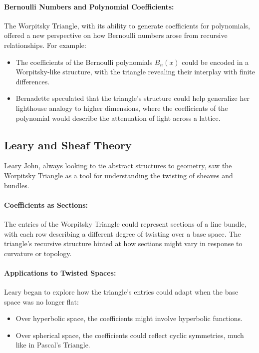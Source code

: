 \paragraph{Bernoulli Numbers and Polynomial Coefficients:} The Worpitsky Triangle, with its ability to generate coefficients for polynomials, offered a new perspective on how Bernoulli numbers arose from recursive relationships. For example:
\begin{itemize}
    \item The coefficients of the Bernoulli polynomials \(B_n(x)\) could be encoded in a Worpitsky-like structure, with the triangle revealing their interplay with finite differences.
    \item Bernadette speculated that the triangle’s structure could help generalize her lighthouse analogy to higher dimensions, where the coefficients of the polynomial would describe the attenuation of light across a lattice.
\end{itemize}

\subsection*{Leary and Sheaf Theory}
Leary John, always looking to tie abstract structures to geometry, saw the Worpitsky Triangle as a tool for understanding the twisting of sheaves and bundles.

\paragraph{Coefficients as Sections:} The entries of the Worpitsky Triangle could represent sections of a line bundle, with each row describing a different degree of twisting over a base space. The triangle’s recursive structure hinted at how sections might vary in response to curvature or topology.

\paragraph{Applications to Twisted Spaces:} Leary began to explore how the triangle’s entries could adapt when the base space was no longer flat:
\begin{itemize}
    \item Over hyperbolic space, the coefficients might involve hyperbolic functions.
    \item Over spherical space, the coefficients could reflect cyclic symmetries, much like in Pascal’s Triangle.
\end{itemize}

